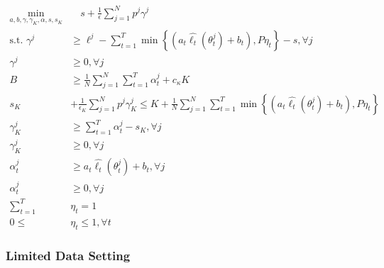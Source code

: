 \documentclass[11pt]{article}
\begin{document}
      \begin{align}
          \min_{a,b,\gamma,\gamma_K,\alpha,s,s_K} &\quad s + \frac{1}{\epsilon}\sum_{j=1}^N p^j \gamma^j\\
          \text{s.t.   } \gamma^j &\geq \ell^j - \sum_{t=1}^T \min \left \{(a_t \hat{\ell_t}(\theta_t^j) + b_t), P\eta_t \right \} - s, \forall j\\
          \gamma^j &\geq 0, \forall j \\
            B &\geq \frac{1}{N}\sum_{j=1}^N \sum_{t=1}^T \alpha^j_t + c_{\kappa} K\\
            s_K &+ \frac{1}{\epsilon_K} \sum_{j=1}^N p^j \gamma_K^j \leq K+ \frac{1}{N}\sum_{j=1}^N \sum_{t=1}^T \min \left \{(a_t \hat{\ell_t}(\theta_t^j) + b_t), P\eta_t \right \} \\
            \gamma_K^j &\geq \sum_{t=1}^T \alpha^j_t -s_K, \forall j \\
            \gamma_K^j &\geq 0, \forall j\\
            \alpha^j_t &\geq a_t \hat{\ell_t}(\theta^j_t) + b_t, \forall j\\
            \alpha^j_t &\geq 0, \forall j\\
            \sum_{t=1}^T & \eta_t = 1\\
        0 \leq &\eta_t \leq 1, \forall t
      \end{align}
    
    \subsubsection{Limited Data Setting}
    
\end{document}
